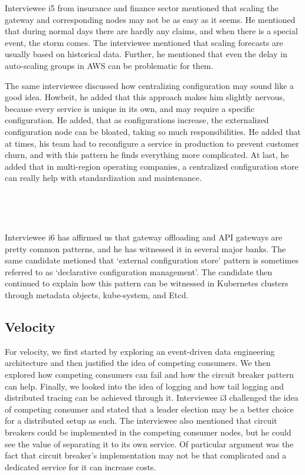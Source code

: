 \documentclass{bmcart}
\begin{document}
Interviewee i5 from insurance and finance sector mentioned that scaling the gateway and corresponding nodes may not be as easy as it seems. He mentioned that during normal days there are hardly any claims, and when there is a special event, the storm comes. The interviewee mentioned that scaling forecasts are usually based on historical data. Further, he mentioned that even the delay in auto-scaling groups in AWS can be problematic for them. 

The same interviewee discussed how centralizing configuration may sound like a good idea. Howbeit, he added that this approach makes him slightly nervous, because every service is unique in its own, and may require a specific configuration. He added, that as configurations increase, the externalized configuration node can be bloated, taking so much responsibilities. He added that at times, his team had to reconfigure a service in production to prevent customer churn, and with this pattern he finds everything more complicated. At last, he added that in multi-region operating companies, a centralized configuration store can really help with standardization and maintenance. 

\,

\setlength{\fboxsep}{0.7em}
\noindent{}

\,

Interviewee i6 has affirmed us that gateway offloading and API gateways are pretty common patterns, and he has witnessed it in several major banks. The same candidate metioned that `external configuration store' pattern is sometimes referred to as `declarative configuration management'. The candidate then continued to explain how this pattern can be witnessed in Kubernetes clusters through metadata objects, kube-system, and Etcd.


\subsection{Velocity}

For velocity, we first started by exploring an event-driven data engineering architecture and then justified the idea of competing consumers. We then explored how competing consumers can fail and how the circuit breaker pattern can help. Finally, we looked into the idea of logging and how tail logging and distributed tracing can be achieved through it. Interviewee i3 challenged the idea of competing consumer and stated that a leader election may be a better choice for a distributed setup as such. The interviewee also mentioned that circuit breakers could be implemented in the competing consumer nodes, but he could see the value of separating it to its own service. Of particular argument was the fact that circuit breaker's implementation may not be that complicated and a dedicated service for it can increase costs.  
\end{document}
